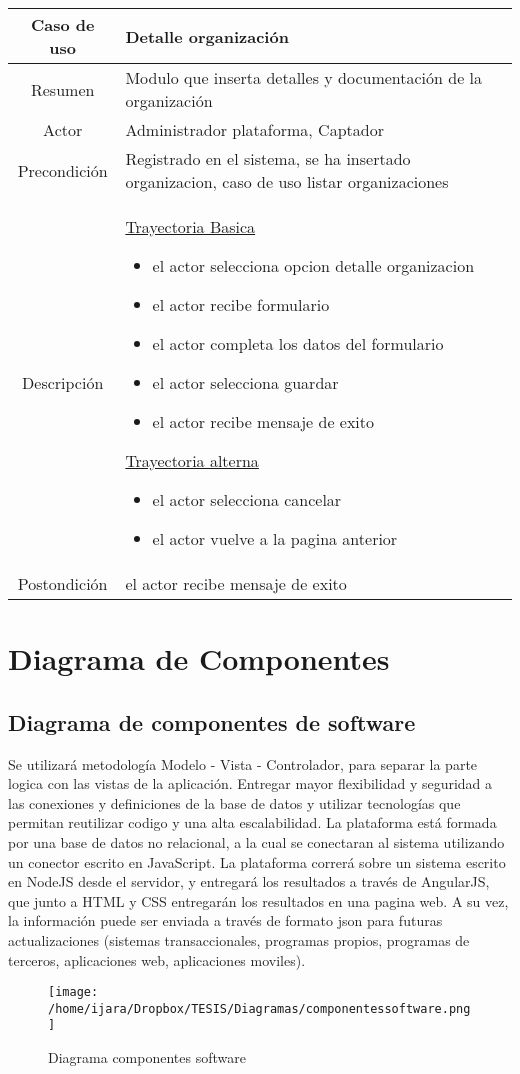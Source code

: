 \documentclass[letterpaper,openright,10pt,oneside]{report}
\begin{document}
\begin{tabular}{|c|p{110mm}|}
\hline
	Caso de uso & Detalle organización\\
\hline
	Resumen & Modulo que inserta detalles y documentación de la organización\\
\hline
	Actor & Administrador plataforma, Captador\\
\hline
	Precondición & Registrado en el sistema, se ha insertado organizacion, caso de uso listar organizaciones\\
\hline
	Descripción & 
	\underline{Trayectoria Basica}
	\begin{itemize}
		\item el actor selecciona opcion detalle organizacion
		\item el actor recibe formulario
		\item el actor completa los datos del formulario
		\item el actor selecciona guardar
		\item el actor recibe mensaje de exito
	\end{itemize}
	\underline{Trayectoria alterna}
	\begin{itemize}
		\item el actor selecciona cancelar
		\item el actor vuelve a la pagina anterior
	\end{itemize}\\
\hline
	Postondición & el actor recibe mensaje de exito\\
\hline
\end{tabular}
\chapter{Diagrama de Componentes}
\section{Diagrama de componentes de software}
Se utilizará metodología Modelo - Vista - Controlador, para separar la parte logica con las vistas de la aplicación. Entregar mayor flexibilidad y seguridad a las conexiones y definiciones de la base de datos y utilizar tecnologías que permitan reutilizar codigo y una alta escalabilidad. La plataforma está formada por una base de datos no relacional, a la cual se conectaran al sistema utilizando un conector escrito en JavaScript. La plataforma correrá sobre un sistema escrito en NodeJS desde el servidor, y entregará los resultados a través de AngularJS, que junto a HTML y CSS entregarán los resultados en una pagina web. A su vez, la información puede ser enviada a través de formato json para futuras actualizaciones (sistemas transaccionales, programas propios, programas de terceros, aplicaciones web, aplicaciones moviles).
\begin{figure}[htp]
\centering
\texttt{[image: /home/ijara/Dropbox/TESIS/Diagramas/componentessoftware.png]}
\caption{Diagrama componentes software}
\label{}
\end{figure}
\end{document}
